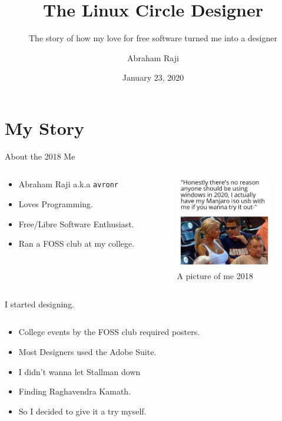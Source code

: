 \documentclass[presentation]{beamer}
\author{Abraham Raji}
\date{January 23, 2020}
\title{The Linux Circle Designer}
\subtitle{The story of how my love for free software turned me into a designer}}
\begin{document}
\maketitle

\section*{My Story}
\label{sec:org9c3ff6a}
\begin{frame}[label={sec:org9c12808},fragile]{About the 2018 Me}
 \begin{columns}
\begin{column}{0.5\columnwidth}
\begin{itemize}
\item Abraham Raji a.k.a \texttt{avronr}
\item Loves Programming.
\item Free/Libre Software Enthusiast.
\item Ran a FOSS club at my college.
\end{itemize}
\end{column}
\begin{column}{0.5\columnwidth}
\begin{figure}[htbp]
\centering
\includegraphics[height=40mm]{./images/meold.png}
\caption{A picture of me 2018}
\end{figure}
\end{column}
\end{columns}
\end{frame}
\begin{frame}[label={sec:org8a8251d}]{I started designing.}
\begin{columns}
\begin{column}{0.7\columnwidth}
\begin{itemize}
\item College events by the FOSS club required posters.
\item Most Designers used the Adobe Suite.
\item I didn't wanna let Stallman down
\item Finding Raghavendra Kamath.
\item So I decided to give it a try myself.
\end{itemize}
\end{column}
\end{columns}
\end{frame}
\end{document}
